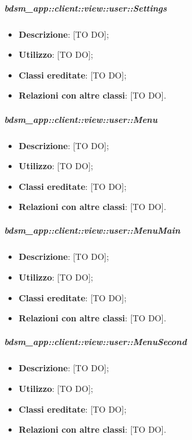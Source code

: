 			\subparagraph{bdsm\_app::client::view::user::Settings} %
			\label{subp:bdsm_app_client_view_user_settings}
				\begin{itemize}
					\item \textbf{Descrizione}: [TO DO];
					\item \textbf{Utilizzo}: [TO DO];
					\item \textbf{Classi ereditate}: [TO DO];
					\item \textbf{Relazioni con altre classi}: [TO DO].
				\end{itemize}

			\subparagraph{bdsm\_app::client::view::user::Menu} %
			\label{subp:bdsm_app_client_view_user_menu}
				\begin{itemize}
					\item \textbf{Descrizione}: [TO DO];
					\item \textbf{Utilizzo}: [TO DO];
					\item \textbf{Classi ereditate}: [TO DO];
					\item \textbf{Relazioni con altre classi}: [TO DO].
				\end{itemize}

			\subparagraph{bdsm\_app::client::view::user::MenuMain} %
			\label{subp:bdsm_app_client_view_user_menumain}
				\begin{itemize}
					\item \textbf{Descrizione}: [TO DO];
					\item \textbf{Utilizzo}: [TO DO];
					\item \textbf{Classi ereditate}: [TO DO];
					\item \textbf{Relazioni con altre classi}: [TO DO].
				\end{itemize}

			\subparagraph{bdsm\_app::client::view::user::MenuSecond} %
			\label{subp:bdsm_app_client_view_user_menusecond}
				\begin{itemize}
					\item \textbf{Descrizione}: [TO DO];
					\item \textbf{Utilizzo}: [TO DO];
					\item \textbf{Classi ereditate}: [TO DO];
					\item \textbf{Relazioni con altre classi}: [TO DO].
				\end{itemize}

